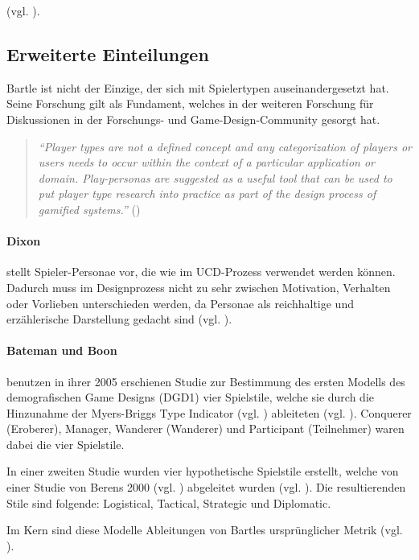 (vgl. \cite{bartle_hearts_1996}).

\subsection{Erweiterte Einteilungen}
Bartle ist nicht der Einzige, der sich mit Spielertypen auseinandergesetzt hat. Seine Forschung gilt als Fundament, welches in der weiteren Forschung für Diskussionen in der Forschungs- und Game-Design-Community gesorgt hat. 
\begin{quote}
    \textit{
        \enquote{Player types are not a defined concept and any categorization of players or users needs to occur within the context of a particular application or domain. Play-personas are suggested as a useful tool that can be used to put player type research into practice as part of the design process of gamified systems.}
    } 
    (\cite{dixon_player_nodate})
\end{quote}

\paragraph{Dixon} 
stellt Spieler-Personae vor, die wie im \ac{UCD}-Prozess verwendet werden können. Dadurch muss im Designprozess nicht zu sehr zwischen Motivation, Verhalten oder Vorlieben unterschieden werden, da Personae als reichhaltige und erzählerische Darstellung gedacht sind (vgl. \cite{dixon_player_nodate}).

\paragraph{Bateman und Boon}
benutzen in ihrer 2005 erschienen Studie zur Bestimmung des ersten Modells des demografischen Game Designs (DGD1) vier Spielstile, welche sie durch die Hinzunahme der Myers-Briggs Type Indicator (vgl. \cite{noauthor_mbti_nodate}) ableiteten (vgl. \cite{bateman_21st_2005}).
Conquerer (Eroberer), Manager, Wanderer (Wanderer) und Participant (Teilnehmer) waren dabei die vier Spielstile.

In einer zweiten Studie wurden vier hypothetische Spielstile erstellt, welche von einer Studie von Berens 2000 (vgl. \cite{berens_understanding_2000}) abgeleitet wurden (vgl. \cite{bateman_player_2012}). Die resultierenden Stile sind folgende: Logistical, Tactical, Strategic und Diplomatic.

Im Kern sind diese Modelle Ableitungen von Bartles ursprünglicher Metrik (vgl. \cite{ludologie_spielertypen_nodate}).

